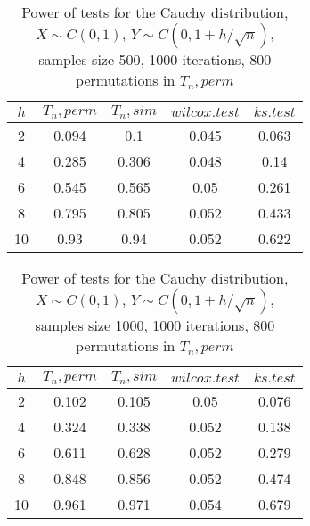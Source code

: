 \documentclass[slidestop,usepdftitle=false]{beamer}
\begin{document}
\begin{slide}
\begin{longtable}{|c|c|c|c|c|}
  \caption{Power of tests for the Cauchy distribution, \\
           $X\sim C(0,1)$, $Y\sim C(0, 1 + h/\sqrt{n})$, \\
           samples size 500, 1000 iterations, 800 permutations in $T_n, perm$} \\
  \hline
  $h$ & $T_n, perm$ & $T_n, sim$ & $wilcox.test$ & $ks.test$ \\
  \hline
  2 & 0.094 & 0.1 & 0.045 & 0.063 \\
  4 & 0.285 & 0.306 & 0.048 & 0.14 \\
  6 & 0.545 & 0.565 & 0.05 & 0.261 \\
  8 & 0.795 & 0.805 & 0.052 & 0.433 \\
  10 & 0.93 & 0.94 & 0.052 & 0.622 \\
  \hline
\end{longtable}
\end{slide}

\begin{slide}
\begin{longtable}{|c|c|c|c|c|}
  \caption{Power of tests for the Cauchy distribution, \\
           $X\sim C(0,1)$, $Y\sim C(0, 1 + h/\sqrt{n})$, \\
           samples size 1000, 1000 iterations, 800 permutations in $T_n, perm$} \\
  \hline
  $h$ & $T_n, perm$ & $T_n, sim$ & $wilcox.test$ & $ks.test$ \\
  \hline
  2 & 0.102 & 0.105 & 0.05 & 0.076 \\
  4 & 0.324 & 0.338 & 0.052 & 0.138 \\
  6 & 0.611 & 0.628 & 0.052 & 0.279 \\
  8 & 0.848 & 0.856 & 0.052 & 0.474 \\
  10 & 0.961 & 0.971 & 0.054 & 0.679 \\
  \hline
\end{longtable}
\end{slide}
\end{document}
